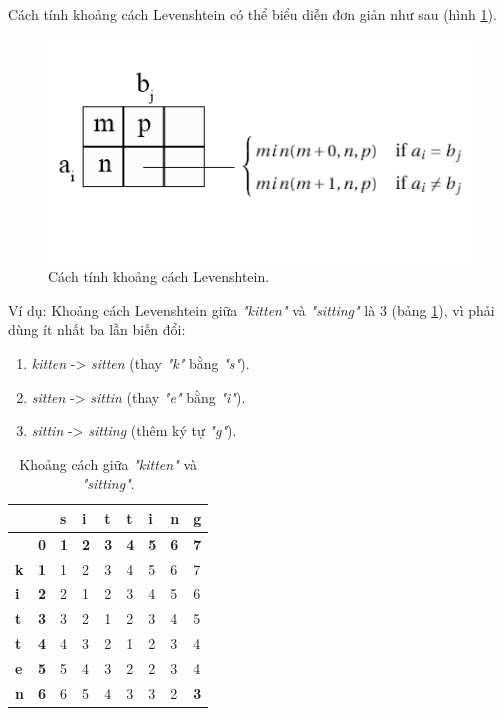 
Cách tính khoảng cách Levenshtein có thể biểu diễn đơn giản như sau (hình \ref{fig:levdis}).
\begin{figure}[H]
	\centering
		\includegraphics[width=0.7\columnwidth]{books/artificial-neural-network/chapter07/figure-sec4/levdis.png}
		\centering
	\caption{Cách tính khoảng cách Levenshtein.}
	\label{fig:levdis}
\end{figure}

Ví dụ: Khoảng cách Levenshtein giữa \textit{"kitten"} và \textit{"sitting"} là 3 (bảng \ref{Tab:kitten-sitting}), vì phải dùng ít nhất ba lần biến đổi:
\begin{enumerate}
    \item \textit{kitten} -> \textit{sitten} (thay \textit{"k"} bằng \textit{"s"}).
    \item \textit{sitten} -> \textit{sittin} (thay \textit{"e"} bằng \textit{"i"}).
    \item \textit{sittin} -> \textit{sitting} (thêm ký tự \textit{"g"}).
\end{enumerate}

\begin{table}[H]
\caption{Khoảng cách giữa \textit{"kitten"} và \textit{"sitting"}.}
\centering
    \begin{tabular}{|l|l|l|l|l|l|l|l|l|}
    \hline
     &  & \textbf{s} & \textbf{i} & \textbf{t} & \textbf{t} & \textbf{i} & \textbf{n} & \textbf{g} \\ \hline
     & \textbf{0} & \textbf{1} & \textbf{2} & \textbf{3} & \textbf{4} & \textbf{5} & \textbf{6} & \textbf{7} \\ \hline
    \textbf{k} & \textbf{1} & 1 & 2 & 3 & 4 & 5 & 6 & 7 \\ \hline
    \textbf{i} & \textbf{2} & 2 & 1 & 2 & 3 & 4 & 5 & 6 \\ \hline
    \textbf{t} & \textbf{3} & 3 & 2 & 1 & 2 & 3 & 4 & 5 \\ \hline
    \textbf{t} & \textbf{4} & 4 & 3 & 2 & 1 & 2 & 3 & 4 \\ \hline
    \textbf{e} & \textbf{5} & 5 & 4 & 3 & 2 & 2 & 3 & 4 \\ \hline
    \textbf{n} & \textbf{6} & 6 & 5 & 4 & 3 & 3 & 2 & {\color[HTML]{FE0000} \textbf{3}} \\ \hline
    \end{tabular}
    \label{Tab:kitten-sitting}
\end{table}


